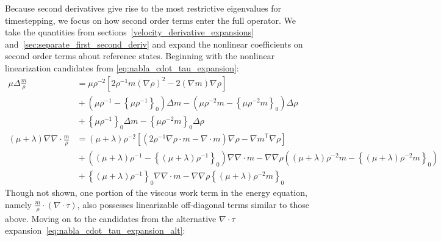 \documentclass[letterpaper,11pt,nointlimits,reqno,draft]{amsart}
\newcommand{\trans}[1]{{#1}^{\ensuremath{\mathsf{T}}}}
\newcommand{\reference}[1]{\ensuremath{\left\{#1\right\}_{0}}}
\newcommand{\lessreference}[1]
  {\ensuremath{\left({#1}-\reference{#1}\right)}}
\begin{document}
Because second derivatives give rise to the most restrictive eigenvalues for
timestepping, we focus on how second order terms enter the full operator.  We
take the quantities from sections~\ref{velocity_derivative_expansions}
and~\ref{sec:separate_first_second_deriv} and expand the nonlinear coefficients on
second order terms about reference states.  Beginning with the nonlinear
linearization candidates from \eqref{eq:nabla_cdot_tau_expansion}:
\begin{align}
\label{eq:linearready_delta_u}
\mu\Delta\frac{m}{\rho} &=
    \mu\rho^{-2}\left[
          2\rho^{-1}m\left(\nabla\rho\right)^{2}
        - 2 \left(\nabla{}m\right)\nabla\rho
    \right]
\\
  &{}+ \lessreference{\mu\rho^{-1}} \Delta{}m
     - \lessreference{\mu\rho^{-2}m} \Delta\rho
\\
  &{}+ \reference{\mu\rho^{-1}} \Delta{}m
     - \reference{\mu\rho^{-2}m} \Delta\rho
\\
\label{eq:linearready_grad_div_u}
\left(\mu+\lambda\right)\nabla\nabla\cdot\frac{m}{\rho} &=
   \left(\mu+\lambda\right)\rho^{-2}\left[
       \left(2\rho^{-1}\nabla\rho\cdot{}m-\nabla\cdot{}m\right)\nabla\rho
     - \trans{\nabla{}m}\nabla\rho
   \right]
\\
  &{}+ \lessreference{\left(\mu+\lambda\right)\rho^{-1}} \nabla\nabla\cdot{}m
     - \nabla\nabla\rho \lessreference{\left(\mu+\lambda\right)\rho^{-2}m}
\\
  &{}+ \reference{\left(\mu+\lambda\right)\rho^{-1}} \nabla\nabla\cdot{}m
     - \nabla\nabla\rho \reference{\left(\mu+\lambda\right)\rho^{-2}m}
\end{align}
Though not shown, one portion of the viscous work term in the energy equation,
namely $\frac{m}{\rho}\cdot\left(\nabla\cdot\tau\right)$, also possesses
linearizable off-diagonal terms similar to those above.  Moving on to the
candidates from the alternative $\nabla\cdot\tau$
expansion~\eqref{eq:nabla_cdot_tau_expansion_alt}:
\end{document}
